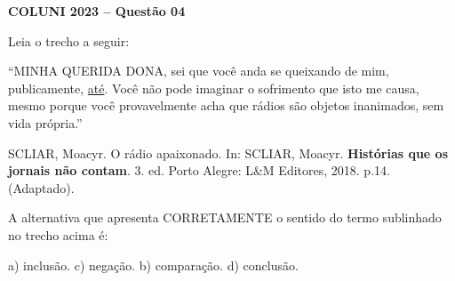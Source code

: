 \textbf{COLUNI 2023 -- Questão 04}\par\medskip Leia o trecho a seguir:

\par

“MINHA QUERIDA DONA, sei que você anda se queixando de mim, publicamente, \underline{até}. Você não pode imaginar o sofrimento que isto me causa, mesmo porque você provavelmente acha que rádios são objetos inanimados, sem vida própria.”

\par

SCLIAR, Moacyr. O rádio apaixonado. In: SCLIAR, Moacyr. \textbf{Histórias que os jornais não contam}. 3. ed. Porto Alegre: L\&M Editores, 2018. p.14. (Adaptado).

\par

A alternativa que apresenta CORRETAMENTE o sentido do termo sublinhado no trecho acima é:

\par

a) inclusão.                                             c) negação. b) comparação.                                           d) conclusão.
